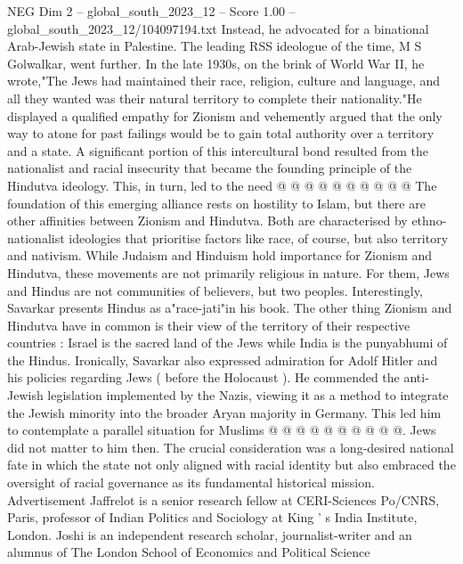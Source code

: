 \begin{textsample}{NEG Dim 2 – global\_south\_2023\_12 – Score 1.00 – global\_south\_2023\_12/104097194.txt}
Instead, he advocated for a binational Arab-Jewish state in Palestine.
The leading RSS ideologue of the time, M S Golwalkar, went further.
In the late 1930s, on the brink of World War II, he wrote,"The Jews had maintained their race, religion, culture and language, and all they wanted was their natural territory to complete their nationality."He displayed a qualified empathy for Zionism and vehemently argued that the only way to atone for past failings would be to gain total authority over a territory and a state.
A significant portion of this intercultural bond resulted from the nationalist and racial insecurity that became the founding principle of the Hindutva ideology.
This, in turn, led to the need @ @ @ @ @ @ @ @ @ @ The foundation of this emerging alliance rests on hostility to Islam, but there are other affinities between Zionism and Hindutva.
Both are characterised by ethno-nationalist ideologies that prioritise factors like race, of course, but also territory and nativism.
While Judaism and Hinduism hold importance for Zionism and Hindutva, these movements are not primarily religious in nature.
For them, Jews and Hindus are not communities of believers, but two peoples.
Interestingly, Savarkar presents Hindus as a"race-jati"in his book.
The other thing Zionism and Hindutva have in common is their view of the territory of their respective countries : Israel is the sacred land of the Jews while India is the punyabhumi of the Hindus.
Ironically, Savarkar also expressed admiration for Adolf Hitler and his policies regarding Jews ( before the Holocaust ).
He commended the anti-Jewish legislation implemented by the Nazis, viewing it as a method to integrate the Jewish minority into the broader Aryan majority in Germany.
This led him to contemplate a parallel situation for Muslims @ @ @ @ @ @ @ @ @ @.
Jews did not matter to him then.
The crucial consideration was a long-desired national fate in which the state not only aligned with racial identity but also embraced the oversight of racial governance as its fundamental historical mission.
Advertisement Jaffrelot is a senior research fellow at CERI-Sciences Po/CNRS, Paris, professor of Indian Politics and Sociology at King ' s India Institute, London.
Joshi is an independent research scholar, journalist-writer and an alumnus of The London School of Economics and Political Science

\end{textsample}
